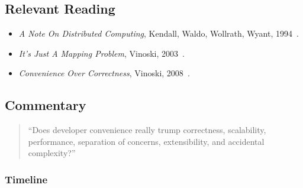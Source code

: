 \subsection{Relevant Reading}

\begin{itemize}
	\item \textit{A Note On Distributed Computing}, Kendall, Waldo, Wollrath, Wyant, 1994~\cite{kendall1994note}.
	\item \textit{It's Just A Mapping Problem}, Vinoski, 2003~\cite{vinoski2003s}.
	\item \textit{Convenience Over Correctness}, Vinoski, 2008~\cite{vinoski2008convenience}.
\end{itemize}

\subsection{Commentary}

\begin{quote}
``Does developer convenience really trump correctness, scalability,
performance, separation of concerns, extensibility, and accidental
complexity?''~\cite{vinoski2008convenience}
\end{quote}

\subsubsection{Timeline}

